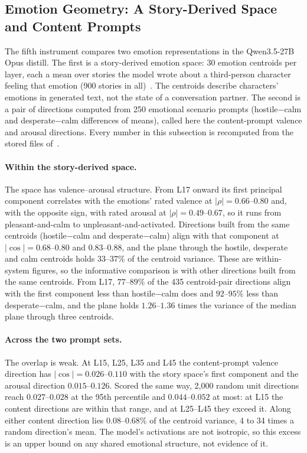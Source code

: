 \subsection{Emotion Geometry: A Story-Derived Space and Content Prompts}
\label{sec:circumplex}

The fifth instrument compares two emotion representations in the Qwen3.5-27B Opus
distill. The first is a story-derived emotion space: 30 emotion centroids per layer,
each a mean over stories the model wrote about a third-person character feeling that
emotion (900 stories in all)~\citep{lyra2026usermodel}. The centroids describe
characters' emotions in generated text, not the state of a conversation partner. The
second is a pair of directions computed from 250 emotional scenario prompts
(hostile$-$calm and desperate$-$calm differences of means), called here the
content-prompt valence and arousal directions. Every number in this subsection is
recomputed from the stored files of~\citet{nexus2026coupling}.

\paragraph{Within the story-derived space.} The space has valence--arousal structure.
From L17 onward its first principal component correlates with the emotions' rated
valence at $|\rho| = 0.66$--$0.80$ and, with the opposite sign, with rated arousal at
$|\rho| = 0.49$--$0.67$, so it runs from pleasant-and-calm to unpleasant-and-activated.
Directions built from the same centroids (hostile$-$calm and desperate$-$calm) align
with that component at $|\cos| = 0.68$--$0.80$ and $0.83$--$0.88$, and the plane
through the hostile, desperate and calm centroids holds $33$--$37\%$ of the centroid
variance. These are within-system figures, so the informative comparison is with
other directions built from the same centroids. From L17, $77$--$89\%$ of the 435
centroid-pair directions align with the first component less than hostile$-$calm does
and $92$--$95\%$ less than desperate$-$calm, and the plane holds $1.26$--$1.36$ times
the variance of the median plane through three centroids.

\paragraph{Across the two prompt sets.} The overlap is weak. At L15, L25, L35 and L45
the content-prompt valence direction has $|\cos| = 0.026$--$0.110$ with the story
space's first component and the arousal direction $0.015$--$0.126$. Scored the same
way, 2,000 random unit directions reach $0.027$--$0.028$ at the 95th percentile and
$0.044$--$0.052$ at most: at L15 the content directions are within that range, and at
L25--L45 they exceed it. Along either content direction lies $0.08$--$0.68\%$ of the
centroid variance, 4 to 34 times a random direction's mean. The model's activations are
not isotropic, so this excess is an upper bound on any shared emotional structure, not
evidence of it.

